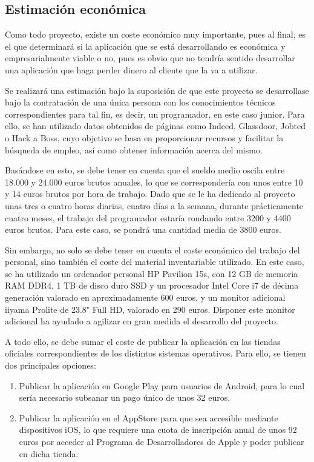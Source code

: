 \documentclass{article}
\begin{document}
\subsection{Estimación económica}

Como todo proyecto, existe un coste económico muy importante, pues al final, es el que determinará si la aplicación que se está desarrollando es económica y empresarialmente viable o no, pues es obvio que no tendría sentido desarrollar una aplicación que haga perder dinero al cliente que la va a utilizar.

Se realizará una estimación bajo la suposición de que este proyecto se desarrollase bajo la contratación de una única persona con los conocimientos técnicos correspondientes para tal fin, es decir, un programador, en este caso junior. Para ello, se han utilizado datos obtenidos de páginas como Indeed, Glassdoor, Jobted o Hack a Boss, cuyo objetivo se basa en proporcionar recursos y facilitar la búsqueda de empleo, así como obtener información acerca del mismo.

Basándose en esto, se debe tener en cuenta que el sueldo medio oscila entre 18.000 y 24.000 euros brutos anuales, lo que se correspondería con unos entre 10 y 14 euros brutos por hora de trabajo. Dado que se le ha dedicado al proyecto unas tres o cuatro horas diarias, cuatro días a la semana, durante prácticamente cuatro meses, el trabajo del programador estaría rondando entre 3200 y 4400 euros brutos. Para este caso, se pondrá una cantidad media de 3800 euros.

Sin embargo, no solo se debe tener en cuenta el coste económico del trabajo del personal, sino también el coste del material inventariable utilizado. En este caso, se ha utilizado un ordenador personal HP Pavilion 15s, con 12 GB de memoria RAM DDR4, 1 TB de disco duro SSD y un procesador Intel Core i7 de décima generación valorado en aproximadamente 600 euros, y un monitor adicional iiyama Prolite de 23.8" Full HD, valorado en 290 euros. Disponer este monitor adicional ha ayudado a agilizar en gran medida el desarrollo del proyecto.

A todo ello, se debe sumar el coste de publicar la aplicación en las tiendas oficiales correspondientes de los distintos sistemas operativos. Para ello, se tienen dos principales opciones:

\begin{enumerate}
    \item Publicar la aplicación en Google Play para usuarios de Android, para lo cual sería necesario subsanar un pago único de unos 32 euros.
    \item Publicar la aplicación en el AppStore para que sea accesible mediante dispositivos iOS, lo que requiere una cuota de inscripción anual de unos 92 euros por acceder al Programa de Desarrolladores de Apple y poder publicar en dicha tienda.
\end{enumerate}
\end{document}
